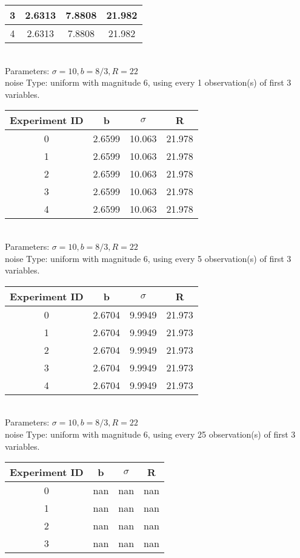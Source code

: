 \begin{multicols}{3}
\begin{tabular}{cccc}
 3 & 2.6313 & 7.8808 & 21.982\\ \hline 
 4 & 2.6313 & 7.8808 & 21.982\\ \hline 
 \end{tabular}\\
Parameters: $\sigma=10, b=8/3, R=22$\\
noise Type: uniform with magnitude 6, using every 1 observation(s) of first 3 variables.\\
\begin{tabular}{cccc}
\hline Experiment ID & b & $\sigma$ & R \\ \hline 
0 & 2.6599 & 10.063 & 21.978\\ \hline 
 1 & 2.6599 & 10.063 & 21.978\\ \hline 
 2 & 2.6599 & 10.063 & 21.978\\ \hline 
 3 & 2.6599 & 10.063 & 21.978\\ \hline 
 4 & 2.6599 & 10.063 & 21.978\\ \hline 
 \end{tabular}\\
Parameters: $\sigma=10, b=8/3, R=22$\\
noise Type: uniform with magnitude 6, using every 5 observation(s) of first 3 variables.\\
\begin{tabular}{cccc}
\hline Experiment ID & b & $\sigma$ & R \\ \hline 
0 & 2.6704 & 9.9949 & 21.973\\ \hline 
 1 & 2.6704 & 9.9949 & 21.973\\ \hline 
 2 & 2.6704 & 9.9949 & 21.973\\ \hline 
 3 & 2.6704 & 9.9949 & 21.973\\ \hline 
 4 & 2.6704 & 9.9949 & 21.973\\ \hline 
 \end{tabular}\\
Parameters: $\sigma=10, b=8/3, R=22$\\
noise Type: uniform with magnitude 6, using every 25 observation(s) of first 3 variables.\\
\begin{tabular}{cccc}
\hline Experiment ID & b & $\sigma$ & R \\ \hline 
0 & nan & nan & nan\\ \hline 
 1 & nan & nan & nan\\ \hline 
 2 & nan & nan & nan\\ \hline 
 3 & nan & nan & nan\\ \hline 

\end{tabular}
\end{multicols}
